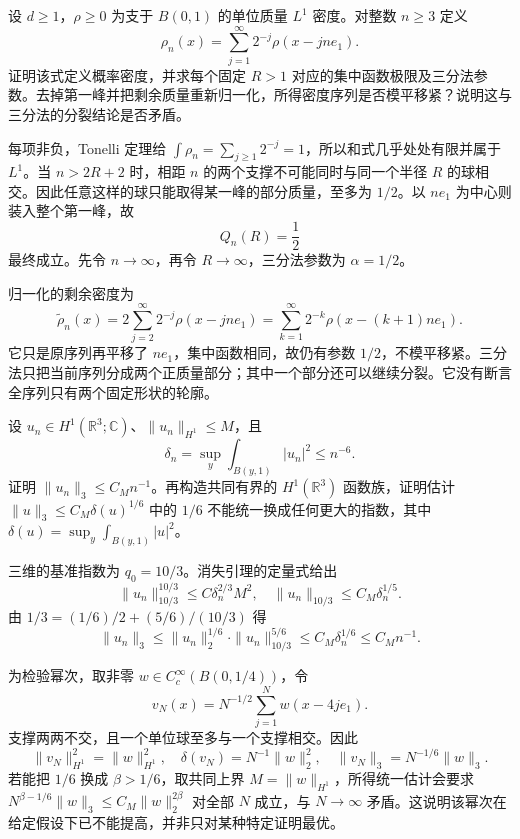 \begin{exercise}\label{b2:ex:app-F-3}
设 \(d\ge1\)，\(\rho\ge0\) 为支于 \(B(0,1)\) 的单位质量 \(L^1\) 密度。对整数 \(n\ge3\) 定义
\[
 \rho_n(x)=\sum_{j=1}^{\infty}2^{-j}\rho(x-jn e_1).
\]
证明该式定义概率密度，并求每个固定 \(R>1\) 对应的集中函数极限及三分法参数。去掉第一峰并把剩余质量重新归一化，所得密度序列是否模平移紧？说明这与三分法的分裂结论是否矛盾。
\end{exercise}
\begin{solution}
每项非负，Tonelli 定理给
\(\int\rho_n=\sum_{j\ge1}2^{-j}=1\)，所以和式几乎处处有限并属于 \(L^1\)。当 \(n>2R+2\) 时，相距 \(n\) 的两个支撑不可能同时与同一个半径 \(R\) 的球相交。因此任意这样的球只能取得某一峰的部分质量，至多为 \(1/2\)。以 \(ne_1\) 为中心则装入整个第一峰，故
\[
 Q_n(R)=\frac12
\]
最终成立。先令 \(n\to\infty\)，再令 \(R\to\infty\)，三分法参数为 \(\alpha=1/2\)。

归一化的剩余密度为
\[
 \widetilde\rho_n(x)
 =2\sum_{j=2}^{\infty}2^{-j}\rho(x-jn e_1)
 =\sum_{k=1}^{\infty}2^{-k}\rho(x-(k+1)n e_1).
\]
它只是原序列再平移了 \(ne_1\)，集中函数相同，故仍有参数 \(1/2\)，不模平移紧。三分法只把当前序列分成两个正质量部分；其中一个部分还可以继续分裂。它没有断言全序列只有两个固定形状的轮廓。
\end{solution}

\begin{exercise}\label{b2:ex:app-F-4}
设 \(u_n\in H^1(\mathbb R^3;\mathbb C)\)、\(\|u_n\|_{H^1}\le M\)，且
\[
 \delta_n=\sup_y\int_{B(y,1)}|u_n|^2\le n^{-6}.
\]
证明 \(\|u_n\|_3\le C_Mn^{-1}\)。再构造共同有界的 \(H^1(\mathbb R^3)\) 函数族，证明估计
\(\|u\|_3\le C_M\delta(u)^{1/6}\)
中的 \(1/6\) 不能统一换成任何更大的指数，其中 \(\delta(u)=\sup_y\int_{B(y,1)}|u|^2\)。
\end{exercise}
\begin{solution}
三维的基准指数为 \(q_0=10/3\)。消失引理的定量式给出
\[
 \|u_n\|_{10/3}^{10/3}\le C\delta_n^{2/3}M^2,
 \quad \|u_n\|_{10/3}\le C_M\delta_n^{1/5}.
\]
由 \(1/3=(1/6)/2+(5/6)/(10/3)\) 得
\[
 \|u_n\|_3
 \le\|u_n\|_2^{1/6}\cdot\|u_n\|_{10/3}^{5/6}
 \le C_M\delta_n^{1/6}\le C_Mn^{-1}.
\]

为检验幂次，取非零 \(w\in C_c^\infty(B(0,1/4))\)，令
\[
 v_N(x)=N^{-1/2}\sum_{j=1}^N w(x-4je_1).
\]
支撑两两不交，且一个单位球至多与一个支撑相交。因此
\[
 \|v_N\|_{H^1}^2=\|w\|_{H^1}^2,
 \quad \delta(v_N)=N^{-1}\|w\|_2^2,
 \quad \|v_N\|_3=N^{-1/6}\|w\|_3.
\]
若能把 \(1/6\) 换成 \(\beta>1/6\)，取共同上界 \(M=\|w\|_{H^1}\)，所得统一估计会要求
\(N^{\beta-1/6}\|w\|_3\le C_M\|w\|_2^{2\beta}\)
对全部 \(N\) 成立，与 \(N\to\infty\) 矛盾。这说明该幂次在给定假设下已不能提高，并非只对某种特定证明最优。
\end{solution}


